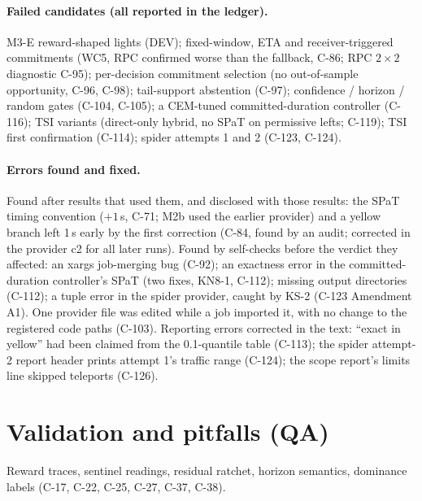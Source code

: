 \documentclass[11pt]{article}
\begin{document}
\paragraph{Failed candidates (all reported in the ledger).} M3-E reward-shaped lights (DEV); fixed-window, ETA and receiver-triggered
commitments (WC5, RPC confirmed worse than the fallback, C-86; RPC $2\times2$ diagnostic C-95); per-decision commitment selection (no
out-of-sample opportunity, C-96, C-98); tail-support abstention (C-97); confidence / horizon / random gates (C-104, C-105); a CEM-tuned
committed-duration controller (C-116); TSI variants (direct-only hybrid, no SPaT on permissive lefts; C-119); TSI first confirmation
(C-114); spider attempts 1 and 2 (C-123, C-124).
\paragraph{Errors found and fixed.} Found after results that used them, and disclosed with those results: the SPaT timing convention
($+1$\,s, C-71; M2b used the earlier provider) and a yellow branch left 1\,s early by the first correction (C-84, found by an audit;
corrected in the provider c2 for all later runs). Found by self-checks before the verdict they affected: an xargs job-merging bug (C-92); an exactness error in the committed-duration controller's SPaT (two fixes, KN8-1, C-112);
missing output directories (C-112); a tuple error in the spider provider, caught by KS-2 (C-123 Amendment A1). One provider file was edited
while a job imported it, with no change to the registered code paths (C-103).
Reporting errors corrected in the text: ``exact in yellow'' had been claimed from the 0.1-quantile table (C-113); the spider attempt-2
report header prints attempt 1's traffic range (C-124); the scope report's limits line skipped teleports (C-126).
\section{Validation and pitfalls (QA)}
Reward traces, sentinel readings, residual ratchet, horizon semantics, dominance labels (C-17, C-22, C-25, C-27, C-37, C-38).
\end{document}
